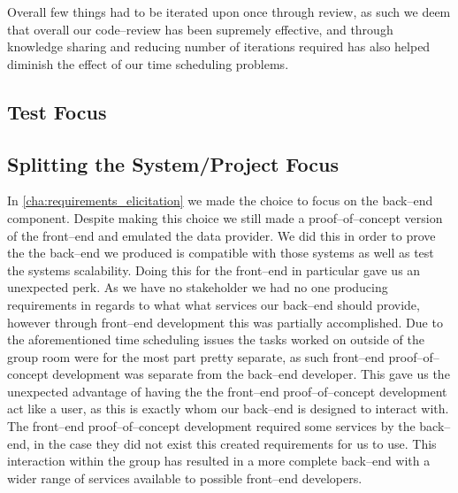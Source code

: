 Overall few things had to be iterated upon once through review, as such we deem that overall our code--review has been supremely effective, and through knowledge sharing and reducing number of iterations required has also helped diminish the effect of our time scheduling problems.
\subsection{Test Focus}
\subsection{Splitting the System/Project Focus}
In \cref{cha:requirements_elicitation} we made the choice to focus on the back--end component.
Despite making this choice we still made a proof--of--concept version of the front--end and emulated the data provider.
We did this in order to prove the the back--end we produced is compatible with those systems as well as test the systems scalability.
Doing this for the front--end in particular gave us an unexpected perk.
As we have no stakeholder we had no one producing requirements in regards to what what services our back--end should provide, however through front--end development this was partially accomplished.
Due to the aforementioned time scheduling issues the tasks worked on outside of the group room were for the most part pretty separate, as such front--end proof--of--concept development was separate from the back--end developer.
This gave us the unexpected advantage of having the the front--end proof--of--concept development act like a user, as this is exactly whom our back--end is designed to interact with.
The front--end proof--of--concept development required some services by the back--end, in the case they did not exist this created requirements for us to use.
This interaction within the group has resulted in a more complete back--end with a wider range of services available to possible front--end developers.

